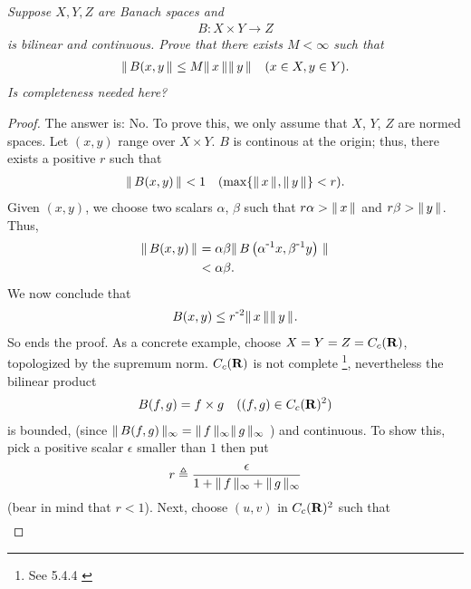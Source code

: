 \textit{
Suppose $X,Y,Z$ are Banach spaces and 
%
  \begin{align*}
    B:X\times Y \to Z
  \end{align*}
is bilinear and continuous. Prove that there exists $M<\infty$ such that 
%
  \begin{align*}
    \| \,B(x, y \, \|_{} \leq M \| \,x \, \|_{}\| \,y \, \|_{} \quad (x\in X, y\in Y).
  \end{align*}
%
Is completeness needed here?}
\begin{proof} The answer is: No. To prove this, we only assume that %
%
  $X$, $Y$, $Z$ %
%
are normed spaces. %
%
Let $(x, y)$ range over $X\times Y$. %
%
$B$ is continous at the origin; thus, there exists a positive $r$ such that %
%
  \begin{align}
    \| \,B(x,y) \, \|_{} < 1 \quad (\max\{\| \,x \, \|_{}, \| \,y \, \|_{}\} < r).
  \end{align}
%
Given $(x, y)$, we choose two scalars  %
%
  $\alpha$, $\beta$ %
%
such that %
%
  $r\alpha > \| \,x \, \|_{} $ and $r\beta >\| \,y \, \|_{}$. %
%
Thus, 
%
  \begin{align}
    \| \,B(x, y) \, \|_{} 
     & = 
    \alpha \beta \| \,
        B\left(
          \alpha^{\text{\small{-}} 1} x, 
          \beta^{\text{\small{-}} 1} y
        \right)
       \, \|_{}\\
    & < \alpha \beta.
  \end{align}
%
We now conclude that %
%
  \begin{align}
      B(x, y)\leq 
    r^{\text{\small{-}} 2} \| \,x \, \|_{}\| \,y \, \|_{}.
  \end{align}
%
So ends the proof. %
%
\newline\newline\noindent %
%
As a concrete example, choose %
%
  $X = Y = Z = C_c({\mathbf R})$, %
%
topologized by the supremum norm. %
%
$C_c({\mathbf R})$ is not complete%
%
  \footnote{
    See 5.4.4 \cite{AnalyseIII} 
  }, %
nevertheless the bilinear product %
%
  \begin{align}
    B(f, g) = f\times g \quad ((f, g)\in C_c(\R)^2) %
  \end{align}
%
is bounded, (since %
    $\| \,B(f,g) \, \|_{\infty} = \| \,f \, \|_{\infty}\| \,g \, \|_{\infty}$%
) %
and continuous. To show this, pick a positive scalar $\epsilon $ %
smaller than $1$ then put %
%
\begin{align}
  r \Def \frac{\epsilon}{1 + \norm{\infty}{f} + \norm{\infty}{g}} %
\end{align}
(bear in mind that $r < 1$). Next, choose $(u, v)$ in $C_c({\mathbf R})^2$ such that %
%
\begin{align}

\end{align}
\end{proof}
